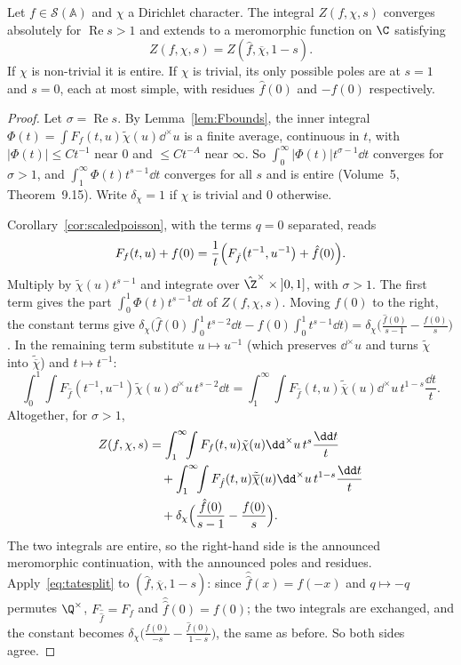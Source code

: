 \begin{theorem}\label{thm:tate}
Let $f\in\mathcal S(\mathbb{A})$ and $\chi$ a Dirichlet character. The integral $Z(f,\chi,s)$ converges absolutely for $\operatorname{Re}s>1$ and extends
to a meromorphic function on $\C$ satisfying
\[
Z(f,\chi,s)=Z(\hat f,\overline\chi,1-s).
\]
If $\chi$ is non-trivial it is entire. If $\chi$ is trivial, its only possible poles are at $s=1$ and $s=0$, each at most simple, with
residues $\hat f(0)$ and $-f(0)$ respectively.
\end{theorem}
\begin{proof}
Let $\sigma=\operatorname{Re}s$. By Lemma~\ref{lem:Fbounds}, the inner integral $\Phi(t)=\int F_f(t,u)\tilde\chi(u)\dd^\times u$ is a finite average,
continuous in $t$, with $|\Phi(t)|\le Ct^{-1}$ near $0$ and $\le Ct^{-A}$ near $\infty$. So $\int_0^\infty|\Phi(t)|t^{\sigma-1}\dd t$ converges for
$\sigma>1$, and $\int_1^\infty\Phi(t)t^{s-1}\dd t$ converges for all $s$ and is entire (Volume~5, Theorem~9.15). Write $\delta_\chi=1$ if $\chi$ is
trivial and $0$ otherwise.

Corollary~\ref{cor:scaledpoisson}, with the terms $q=0$ separated, reads
\[
F_f(t,u)+f(0)=\frac1t\Bigl(F_{\hat f}\bigl(t^{-1},u^{-1}\bigr)+\hat f(0)\Bigr).
\]
Multiply by $\tilde\chi(u)t^{s-1}$ and integrate over $\hat{\Z}^\times\times\left]0,1\right]$, with $\sigma>1$. The first term gives the part
$\int_0^1\Phi(t)t^{s-1}\dd t$ of $Z(f,\chi,s)$. Moving $f(0)$ to the right, the constant terms give
$\delta_\chi\bigl(\hat f(0)\int_0^1t^{s-2}\dd t-f(0)\int_0^1t^{s-1}\dd t\bigr)=\delta_\chi\bigl(\frac{\hat f(0)}{s-1}-\frac{f(0)}s\bigr)$. In the remaining
term substitute $u\mapsto u^{-1}$ (which preserves $\dd^\times u$ and turns $\tilde\chi$ into $\tilde{\overline\chi}$) and $t\mapsto t^{-1}$:
\[
\int_0^1\!\!\int F_{\hat f}(t^{-1},u^{-1})\tilde\chi(u)\dd^\times u\,t^{s-2}\dd t=\int_1^\infty\!\!\int F_{\hat f}(t,u)\tilde{\overline\chi}(u)\dd^\times u\,t^{1-s}\frac{\dd t}t.
\]
Altogether, for $\sigma>1$,
\begin{equation}\label{eq:tatesplit}
\begin{aligned}
Z(f,\chi,s)&=\int_1^\infty\!\!\int F_f(t,u)\tilde\chi(u)\dd^\times u\,t^s\frac{\dd t}t\\
&\quad+\int_1^\infty\!\!\int F_{\hat f}(t,u)\tilde{\overline\chi}(u)\dd^\times u\,t^{1-s}\frac{\dd t}t\\
&\quad+\delta_\chi\Bigl(\frac{\hat f(0)}{s-1}-\frac{f(0)}s\Bigr).
\end{aligned}
\end{equation}
The two integrals are entire, so the right-hand side is the announced meromorphic continuation, with the announced poles and residues.
Apply~\eqref{eq:tatesplit} to $(\hat f,\overline\chi,1-s)$: since $\hat{\hat f}(x)=f(-x)$ and $q\mapsto-q$ permutes $\Q^\times$, $F_{\hat{\hat f}}=F_f$ and
$\hat{\hat f}(0)=f(0)$; the two integrals are exchanged, and the constant becomes $\delta_\chi\bigl(\frac{f(0)}{-s}-\frac{\hat f(0)}{1-s}\bigr)$, the same as
before. So both sides agree.
\end{proof}

